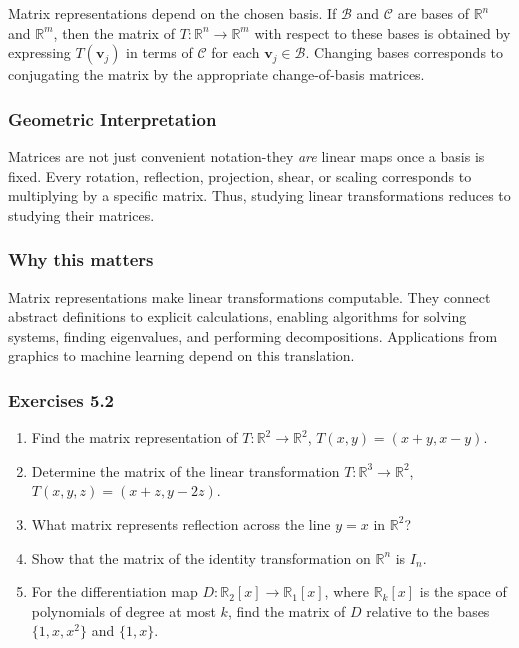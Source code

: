 \documentclass[
  12pt,
  a4paper,
]{article}
\begin{document}
Matrix representations depend on the chosen basis. If \(\mathcal{B}\)
and \(\mathcal{C}\) are bases of \(\mathbb{R}^n\) and \(\mathbb{R}^m\),
then the matrix of \(T: \mathbb{R}^n \to \mathbb{R}^m\) with respect to
these bases is obtained by expressing \(T(\mathbf{v}_j)\) in terms of
\(\mathcal{C}\) for each \(\mathbf{v}_j \in \mathcal{B}\). Changing
bases corresponds to conjugating the matrix by the appropriate
change-of-basis matrices.

\subsubsection{Geometric
Interpretation}\label{geometric-interpretation-9}

Matrices are not just convenient notation-they \emph{are} linear maps
once a basis is fixed. Every rotation, reflection, projection, shear, or
scaling corresponds to multiplying by a specific matrix. Thus, studying
linear transformations reduces to studying their matrices.

\subsubsection{Why this matters}\label{why-this-matters-17}

Matrix representations make linear transformations computable. They
connect abstract definitions to explicit calculations, enabling
algorithms for solving systems, finding eigenvalues, and performing
decompositions. Applications from graphics to machine learning depend on
this translation.

\subsubsection{Exercises 5.2}\label{exercises-52}

\begin{enumerate}
\def\labelenumi{\arabic{enumi}.}
\item
  Find the matrix representation of \(T:\mathbb{R}^2 \to \mathbb{R}^2\),
  \(T(x,y) = (x+y, x-y)\).
\item
  Determine the matrix of the linear transformation
  \(T:\mathbb{R}^3 \to \mathbb{R}^2\), \(T(x,y,z) = (x+z, y-2z)\).
\item
  What matrix represents reflection across the line \(y=x\) in
  \(\mathbb{R}^2\)?
\item
  Show that the matrix of the identity transformation on
  \(\mathbb{R}^n\) is \(I_n\).
\item
  For the differentiation map \(D:\mathbb{R}_2[x] \to \mathbb{R}_1[x]\),
  where \(\mathbb{R}_k[x]\) is the space of polynomials of degree at
  most \(k\), find the matrix of \(D\) relative to the bases
  \(\{1,x,x^2\}\) and \(\{1,x\}\).
\end{enumerate}
\end{document}
